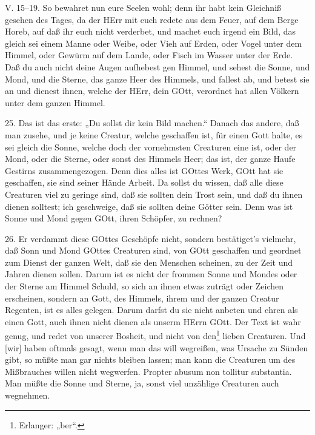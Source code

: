 \begin{schriftzitat}
V. 15–19. So bewahret nun eure Seelen wohl; denn ihr habt kein Gleichniß gesehen des Tages, da der HErr mit euch redete aus dem Feuer, auf dem Berge Horeb, auf daß ihr euch nicht verderbet, und machet euch irgend ein Bild, das gleich sei einem Manne oder Weibe, oder Vieh auf Erden, oder Vogel unter dem Himmel, oder Gewürm auf dem Lande, oder Fisch im Wasser unter der Erde. Daß du auch nicht deine Augen aufhebest gen Himmel, und sehest die Sonne, und Mond, und die Sterne, das ganze Heer des Himmels, und fallest ab, und betest sie an und dienest ihnen, welche der HErr, dein GOtt, verordnet hat allen Völkern unter dem ganzen Himmel.
\end{schriftzitat}

25. Das ist das erste: „Du sollst dir kein Bild machen.“ Danach das andere, daß man zusehe, und je keine Creatur, welche geschaffen ist, für einen Gott halte, es sei gleich die Sonne, welche doch der vornehmsten Creaturen eine ist,
oder der Mond, oder die Sterne, oder sonst des Himmels Heer; das ist, der ganze Haufe Gestirns zusammengezogen. Denn dies alles ist GOttes Werk, GOtt hat sie geschaffen, sie sind seiner Hände Arbeit. Da sollst du wissen, daß alle diese Creaturen viel zu geringe sind, daß sie sollten dein Trost sein, und daß du ihnen dienen solltest; ich geschweige, daß sie sollten deine Götter sein. Denn was ist Sonne und Mond gegen GOtt, ihren Schöpfer, zu rechnen?

26. Er verdammt diese GOttes Geschöpfe nicht, sondern bestätiget’s vielmehr, daß Sonn und Mond GOttes Creaturen sind, von GOtt geschaffen und geordnet zum Dienst der ganzen Welt, daß sie den Menschen scheinen, zu der Zeit und Jahren dienen sollen. Darum ist es nicht der frommen Sonne und Mondes oder der Sterne am Himmel Schuld, so sich an ihnen etwas zuträgt oder Zeichen erscheinen, sondern an Gott, des Himmels, ihrem und der ganzen Creatur Regenten, ist es alles gelegen. Darum darfst du sie nicht anbeten und ehren als einen Gott, auch ihnen nicht dienen als unserm HErrn GOtt. Der Text ist wahr genug, und redet von unserer Bosheit, und nicht von den\footnote{Erlanger: „ber“.} lieben Creaturen. Und [wir] haben oftmals gesagt, wenn man das will wegreißen, was Ursache zu Sünden gibt, so müßte man gar nichts bleiben lassen; man kann die Creaturen um des Mißbrauches willen nicht wegwerfen. Propter abusum non tollitur substantia. Man müßte die Sonne und Sterne, ja, sonst viel unzählige Creaturen auch wegnehmen.

